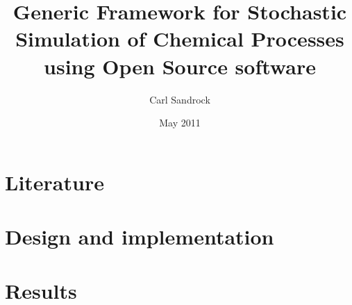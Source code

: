 \documentclass[a4paper, 12pt, %
pdftex]{report} %
\title{Generic Framework for Stochastic Simulation of Chemical Processes using Open Source software}
\author{Carl Sandrock}
\date{May 2011}
\begin{document}



\pagestyle{headings}
\setcounter{page}{1}


\part{Literature}








\part{Design and implementation}


\part{Results}



\appendix
%
%
%
%


\end{document}
